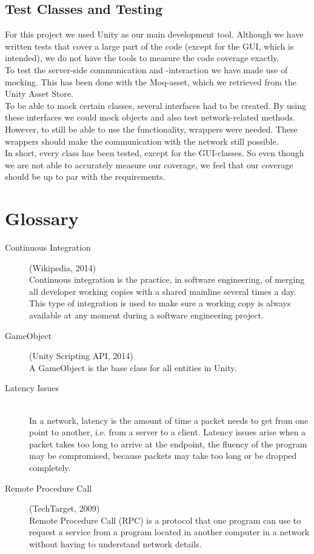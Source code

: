 \documentclass[11pt,twoside,a4paper]{article}
\begin{document}
\subsection{Test Classes and Testing}
For this project we used Unity as our main development tool. Although we have written tests that cover a large part of the code (except for the GUI, which is intended), we do not have the tools to measure the code coverage exactly.\\
\newline
To test the server-side communication and -interaction we have made use of mocking. This has been done with the Moq-asset, which we retrieved from the Unity Asset Store.\\
\newline
To be able to mock certain classes, several interfaces had to be created. By using these interfaces we could mock objects and also test network-related methods. However, to still be able to use the functionality, wrappers were needed. These wrappers should make the communication with the network still possible.\\
\newline
In short, every class has been tested, except for the GUI-classes. So even though we are not able to accurately measure our coverage, we feel that our coverage should be up to par with the requirements.
\newpage


\section{Glossary}
\begin{description}
\item[Continuous Integration] (Wikipedia, 2014) \hfill \\
Continuous integration is the practice, in software engineering, of merging all developer working copies with a shared mainline several times a day. This type of integration is used to make sure a working copy is always available at any moment during a software engineering project.
\item[GameObject] (Unity Scripting API, 2014) \hfill \\
A GameObject is the base class for all entities in Unity.
\item[Latency Issues] \hfill \\
In a network, latency is the amount of time a packet needs to get from one point to another, i.e. from a server to a client. Latency issues arise when a packet takes too long to arrive at the endpoint, the fluency of the program may be compromised, because packets may take too long or be dropped completely. 
\item[Remote Procedure Call] (TechTarget, 2009) \hfill \\
Remote Procedure Call (RPC) is a protocol that one program can use to request a service from a program located in another computer in a network without having to understand network details.\\
\end{description}
\end{document}
